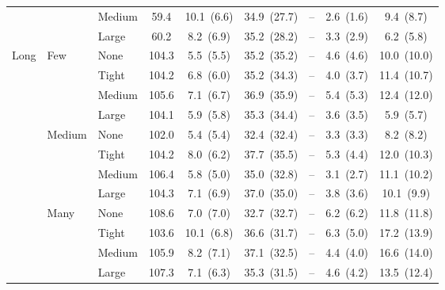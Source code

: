 \begin{table}[htbp]
{\begin{tabular}{lll c ccccc}
 &  & {\small Medium} & 59.4 & 10.1~{\scriptsize(6.6)} & 34.9~{\scriptsize(27.7)} & -- & 2.6~{\scriptsize(1.6)} & 9.4~{\scriptsize(8.7)} \\
 &  & {\small Large} & 60.2 & 8.2~{\scriptsize(6.9)} & 35.2~{\scriptsize(28.2)} & -- & 3.3~{\scriptsize(2.9)} & 6.2~{\scriptsize(5.8)} \\
\midrule
\multirow{12}{*}{\small Long} & \multirow{4}{*}{\small Few} & {\small None} & 104.3 & 5.5~{\scriptsize(5.5)} & 35.2~{\scriptsize(35.2)} & -- & 4.6~{\scriptsize(4.6)} & 10.0~{\scriptsize(10.0)} \\
 &  & {\small Tight} & 104.2 & 6.8~{\scriptsize(6.0)} & 35.2~{\scriptsize(34.3)} & -- & 4.0~{\scriptsize(3.7)} & 11.4~{\scriptsize(10.7)} \\
 &  & {\small Medium} & 105.6 & 7.1~{\scriptsize(6.7)} & 36.9~{\scriptsize(35.9)} & -- & 5.4~{\scriptsize(5.3)} & 12.4~{\scriptsize(12.0)} \\
 &  & {\small Large} & 104.1 & 5.9~{\scriptsize(5.8)} & 35.3~{\scriptsize(34.4)} & -- & 3.6~{\scriptsize(3.5)} & 5.9~{\scriptsize(5.7)} \\
 & \multirow{4}{*}{\small Medium} & {\small None} & 102.0 & 5.4~{\scriptsize(5.4)} & 32.4~{\scriptsize(32.4)} & -- & 3.3~{\scriptsize(3.3)} & 8.2~{\scriptsize(8.2)} \\
 &  & {\small Tight} & 104.2 & 8.0~{\scriptsize(6.2)} & 37.7~{\scriptsize(35.5)} & -- & 5.3~{\scriptsize(4.4)} & 12.0~{\scriptsize(10.3)} \\
 &  & {\small Medium} & 106.4 & 5.8~{\scriptsize(5.0)} & 35.0~{\scriptsize(32.8)} & -- & 3.1~{\scriptsize(2.7)} & 11.1~{\scriptsize(10.2)} \\
 &  & {\small Large} & 104.3 & 7.1~{\scriptsize(6.9)} & 37.0~{\scriptsize(35.0)} & -- & 3.8~{\scriptsize(3.6)} & 10.1~{\scriptsize(9.9)} \\
 & \multirow{4}{*}{\small Many} & {\small None} & 108.6 & 7.0~{\scriptsize(7.0)} & 32.7~{\scriptsize(32.7)} & -- & 6.2~{\scriptsize(6.2)} & 11.8~{\scriptsize(11.8)} \\
 &  & {\small Tight} & 103.6 & 10.1~{\scriptsize(6.8)} & 36.6~{\scriptsize(31.7)} & -- & 6.3~{\scriptsize(5.0)} & 17.2~{\scriptsize(13.9)} \\
 &  & {\small Medium} & 105.9 & 8.2~{\scriptsize(7.1)} & 37.1~{\scriptsize(32.5)} & -- & 4.4~{\scriptsize(4.0)} & 16.6~{\scriptsize(14.0)} \\
 &  & {\small Large} & 107.3 & 7.1~{\scriptsize(6.3)} & 35.3~{\scriptsize(31.5)} & -- & 4.6~{\scriptsize(4.2)} & 13.5~{\scriptsize(12.4)} \\
\bottomrule
\end{tabular}%
}
\end{table}
